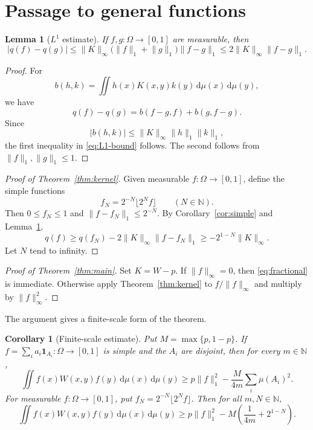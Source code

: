 \documentclass[reqno]{amsart}
\theoremstyle{plain}
\newtheorem{lemma}[theorem]{Lemma}
\newtheorem{corollary}[theorem]{Corollary}
\theoremstyle{remark}
\newcommand{\one}{\mathbf 1}
\newcommand{\N}{\mathbb N}
\newcommand{\dd}{\,\mathrm d}
\newcommand{\norminf}[1]{\lVert #1\rVert_\infty}
\newcommand{\normone}[1]{\lVert #1\rVert_1}
\begin{document}
\section{Passage to general functions}

\begin{lemma}[$L^1$ estimate]\label{lem:continuity}
If $f,g\colon\Omega\to[0,1]$ are measurable, then
\begin{equation}\label{eq:L1-bound}
  |q(f)-q(g)|
  \leq\norminf{K}\bigl(\normone{f}+\normone{g}\bigr)\normone{f-g}
  \leq2\norminf{K}\normone{f-g}.
\end{equation}
\end{lemma}

\begin{proof}
For
\[
  b(h,k)=\iint h(x)K(x,y)k(y)\dd\mu(x)\dd\mu(y),
\]
we have
\[
  q(f)-q(g)=b(f-g,f)+b(g,f-g).
\]
Since
\[
  |b(h,k)|\leq\norminf{K}\normone{h}\normone{k},
\]
the first inequality in \eqref{eq:L1-bound} follows. The second follows from
$\normone{f},\normone{g}\leq1$.
\end{proof}

\begin{proof}[Proof of Theorem~\ref{thm:kernel}]
Given measurable $f\colon\Omega\to[0,1]$, define the simple functions
\[
  f_N=2^{-N}\lfloor2^Nf\rfloor\qquad(N\in\N).
\]
Then $0\leq f_N\leq1$ and $\normone{f-f_N}\leq2^{-N}$. By
Corollary~\ref{cor:simple} and Lemma~\ref{lem:continuity},
\[
  q(f)\geq q(f_N)-2\norminf{K}\normone{f-f_N}
       \geq-2^{1-N}\norminf{K}.
\]
Let $N$ tend to infinity.
\end{proof}

\begin{proof}[Proof of Theorem~\ref{thm:main}]
Set $K=W-p$. If $\norminf{f}=0$, then \eqref{eq:fractional} is immediate.
Otherwise apply Theorem~\ref{thm:kernel} to $f/\norminf{f}$ and multiply by
$\norminf{f}^{2}$.
\end{proof}

The argument gives a finite-scale form of the theorem.

\begin{corollary}[Finite-scale estimate]\label{cor:quantitative}
Put $M=\max\{p,1-p\}$. If
$f=\sum_i a_i\one_{A_i}\colon\Omega\to[0,1]$ is simple and the $A_i$ are
disjoint, then for every $m\in\N$,
\begin{equation}\label{eq:quant-simple}
  \iint f(x)W(x,y)f(y)\dd\mu(x)\dd\mu(y)
  \geq p\normone{f}^{2}
      -\frac{M}{4m}\sum_i\mu(A_i)^2.
\end{equation}
For measurable $f\colon\Omega\to[0,1]$, put
$f_N=2^{-N}\lfloor2^Nf\rfloor$. Then for all $m,N\in\N$,
\begin{equation}\label{eq:quant-general}
  \iint f(x)W(x,y)f(y)\dd\mu(x)\dd\mu(y)
  \geq p\normone{f}^{2}
      -M\left(\frac1{4m}+2^{1-N}\right).
\end{equation}
\end{corollary}
\end{document}
